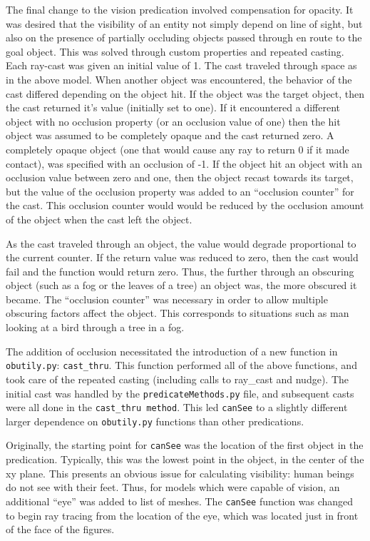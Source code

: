 The final change to the vision predication involved compensation for opacity. It was desired that the visibility of an entity not simply depend on line of sight, but also on the presence of partially occluding objects passed through en route to the goal object. This was solved through custom properties and repeated casting. Each ray-cast was given an initial value of 1. The cast traveled through space as in the above model. When another object was encountered, the behavior of the cast differed depending on the object hit. If the object was the target object, then the cast returned it's value (initially set to one). If it encountered a different object with no occlusion property (or an occlusion value of one) then the hit object was assumed to be completely opaque and the cast returned zero. A completely opaque object (one that would cause any ray to return 0 if it made contact), was specified with an occlusion of -1. If the object hit an object with an occlusion value between zero and one, then the object recast towards its target, but the value of the occlusion property was added to an “occlusion counter” for the cast. This occlusion counter would would be reduced by the occlusion amount of the object when the cast left the object.	

As the cast traveled through an object, the value would degrade proportional to the current counter. If the return value was reduced to zero, then the cast would fail and the function would return zero. Thus, the further through an obscuring object (such as a fog or the leaves of a tree) an object was, the more obscured it became. The “occlusion counter” was necessary in order to allow multiple obscuring factors affect the object. This corresponds to situations such as man looking at a bird through a tree in a fog.

The addition of occlusion necessitated the introduction of a new function in \texttt{obutily.py}: \texttt{cast\_thru}. This function performed all of the above functions, and took care of the repeated casting (including calls to ray\_cast and nudge). The initial cast was handled by the \texttt{predicateMethods.py} file, and subsequent casts were all done in the \texttt{cast\_thru method}. This led \texttt{canSee} to a slightly different larger dependence on \texttt{obutily.py} functions than other predications.


Originally, the starting point for \texttt{canSee} was the location of the first object in the predication.
Typically, this was the lowest point in the object, in the center of the xy plane. 
This presents an obvious issue for calculating visibility: human beings do not see with their feet. 
Thus, for models which were capable of vision, an additional ``eye'' was added to list of meshes. 
The \texttt{canSee} function was changed to begin ray tracing from the location of the eye, which was located just in front of the face of the figures. 

